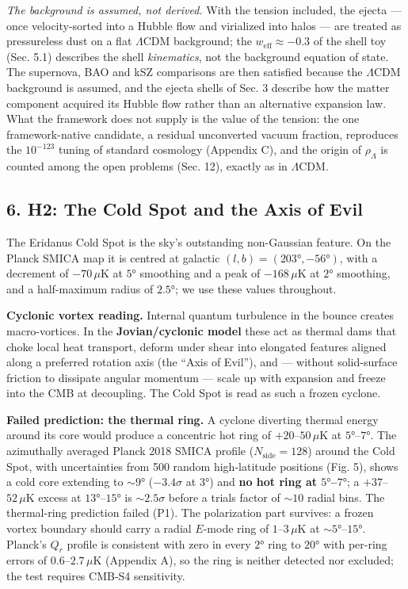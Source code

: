 \documentclass[
]{article}
\begin{document}
\emph{The background is assumed, not derived.} With the tension
included, the ejecta --- once velocity-sorted into a Hubble flow and
virialized into halos --- are treated as pressureless dust on a flat
\(\Lambda\)CDM background; the \(w_{\text{eff}} \approx -0.3\) of the
shell toy (Sec. 5.1) describes the shell \emph{kinematics}, not the
background equation of state. The supernova, BAO and kSZ comparisons are
then satisfied because the \(\Lambda\)CDM background is assumed, and the
ejecta shells of Sec. 3 describe how the matter component acquired its
Hubble flow rather than an alternative expansion law. What the framework
does not supply is the value of the tension: the one framework-native
candidate, a residual unconverted vacuum fraction, reproduces the
\(10^{-123}\) tuning of standard cosmology (Appendix C), and the origin
of \(\rho_\Lambda\) is counted among the open problems (Sec. 12),
exactly as in \(\Lambda\)CDM.

\hypertarget{h2-the-cold-spot-and-the-axis-of-evil}{%
\subsection{\texorpdfstring{\textbf{6. H2: The Cold Spot and the Axis of
Evil}}{6. H2: The Cold Spot and the Axis of Evil}}\label{h2-the-cold-spot-and-the-axis-of-evil}}

The Eridanus Cold Spot is the sky's outstanding non-Gaussian feature. On
the Planck SMICA map it is centred at galactic
\((l, b) = (203°, -56°)\), with a decrement of \(-70\,\mu\)K at \(5°\)
smoothing and a peak of \(-168\,\mu\)K at \(2°\) smoothing, and a
half-maximum radius of \(2.5°\); we use these values throughout.

\textbf{Cyclonic vortex reading.} Internal quantum turbulence in the
bounce creates macro-vortices. In the \textbf{Jovian/cyclonic model}
these act as thermal dams that choke local heat transport, deform under
shear into elongated features aligned along a preferred rotation axis
(the ``Axis of Evil''), and --- without solid-surface friction to
dissipate angular momentum --- scale up with expansion and freeze into
the CMB at decoupling. The Cold Spot is read as such a frozen cyclone.

\textbf{Failed prediction: the thermal ring.} A cyclone diverting
thermal energy around its core would produce a concentric hot ring of
\(+20\)--\(50\,\mu\)K at \(5°\)--\(7°\). The azimuthally averaged Planck
2018 SMICA profile (\(N_{\text{side}} = 128\)) around the Cold Spot,
with uncertainties from 500 random high-latitude positions (Fig. 5),
shows a cold core extending to \(\sim\!9°\) (\(-3.4\sigma\) at \(3°\))
and \textbf{no hot ring at \(5°\)--\(7°\)}; a \(+37\)--\(52\,\mu\)K
excess at \(13°\)--\(15°\) is \(\sim\!2.5\sigma\) before a trials factor
of \(\sim\!10\) radial bins. The thermal-ring prediction failed (P1).
The polarization part survives: a frozen vortex boundary should carry a
radial \(E\)-mode ring of \(1\)--\(3\,\mu\)K at \(\sim\!5°\)--\(15°\).
Planck's \(Q_r\) profile is consistent with zero in every \(2°\) ring to
\(20°\) with per-ring errors of \(0.6\)--\(2.7\,\mu\)K (Appendix A), so
the ring is neither detected nor excluded; the test requires CMB-S4
sensitivity.
\end{document}
